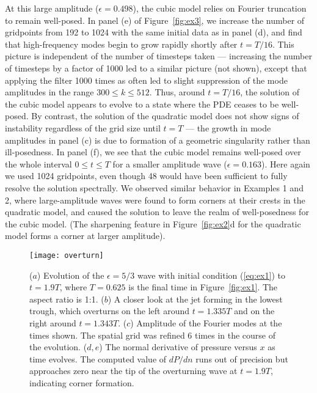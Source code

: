 \documentclass[11pt]{article}
\theoremstyle{plain}
\theoremstyle{definition}
\theoremstyle{definition}
\newcommand{\eps}{\epsilon}
\begin{document}
At this large amplitude ($\eps=0.498$), the cubic model relies on
Fourier truncation to remain well-posed. In panel (e) of
Figure~\ref{fig:ex3}, we increase the number of gridpoints from 192 to
1024 with the same initial data as in panel (d), and find that
high-frequency modes begin to grow rapidly shortly after
$t=T/16$. This picture is independent of the number of timesteps taken
--- increasing the number of timesteps by a factor of 1000 led to a
similar picture (not shown), except that applying the filter 1000
times as often led to slight suppression of the mode amplitudes in the
range $300\le k\le 512$. Thus, around $t=T/16$, the solution of the
cubic model appears to evolve to a state where the PDE ceases to be
well-posed. By contrast, the solution of the quadratic model does not
show signs of instability regardless of the grid size until $t=T$ ---
the growth in mode amplitudes in panel (c) is due to formation of a
geometric singularity rather than ill-posedness.  In panel (f), we see
that the cubic model remains well-posed over the whole interval $0\le
t\le T$ for a smaller amplitude wave ($\eps=0.163$). Here again we
used 1024 gridpoints, even though 48 would have been sufficient to
fully resolve the solution spectrally. We observed similar behavior
in Examples 1 and 2, where large-amplitude waves were found to form
corners at their crests in the quadratic model, and caused the
solution to leave the realm of well-posedness for the cubic
model. (The sharpening feature in Figure~\ref{fig:ex2}d for the
  quadratic model forms a corner at larger amplitude).


\begin{figure}[p]
  \begin{center}
\texttt{[image: overturn]}
\caption{\label{fig:ex1:overturn} ($a$) Evolution of the $\eps=5/3$
  wave with initial condition (\ref{eq:ex1}) to $t=1.9T$, where
  $T=0.625$ is the final time in Figure~\ref{fig:ex1}. The aspect
  ratio is 1:1. ($b$) A closer look at the jet forming in the lowest
  trough, which overturns on the left around $t=1.335T$ and on the
  right around $t=1.343T$. ($c$) Amplitude of the Fourier modes at the
  times shown. The spatial grid was refined 6 times in the course of
  the evolution. ($d,e$) The normal derivative of pressure versus $x$
  as time evolves.  The computed value of $dP/dn$ runs out of
  precision  but approaches zero near the tip of
  the overturning wave at $t=1.9T$, indicating corner formation.}
\end{center}
\end{figure}
\end{document}
